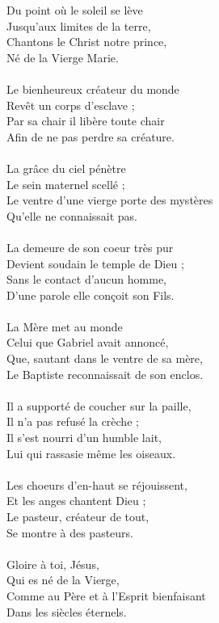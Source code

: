 Du point où le soleil se lève\\
Jusqu’aux limites de la terre,\\
Chantons le Christ notre prince,\\
Né de la Vierge Marie.\\
\\
Le bienheureux créateur du monde\\
Revêt un corps d’esclave ;\\
Par sa chair il libère toute chair\\
Afin de ne pas perdre sa créature.\\
\\
La grâce du ciel pénètre\\
Le sein maternel scellé ;\\
Le ventre d’une vierge porte des mystères\\
Qu’elle ne connaissait pas.\\
\\
La demeure de son coeur très pur\\
Devient soudain le temple de Dieu ;\\
Sans le contact d’aucun homme,\\
D’une parole elle conçoit son Fils.\\
\\
La Mère met au monde\\
Celui que Gabriel avait annoncé,\\
Que, sautant dans le ventre de sa mère,\\
Le Baptiste reconnaissait de son enclos.\\
\\
Il a supporté de coucher sur la paille,\\
Il n’a pas refusé la crèche ;\\
Il s’est nourri d’un humble lait,\\
Lui qui rassasie même les oiseaux.\\
\\
Les choeurs d’en-haut se réjouissent,\\
Et les anges chantent Dieu ;\\
Le pasteur, créateur de tout,\\
Se montre à des pasteurs.\\
\\
Gloire à toi, Jésus,\\
Qui es né de la Vierge,\\
Comme au Père et à l’Esprit bienfaisant\\
Dans les siècles éternels.